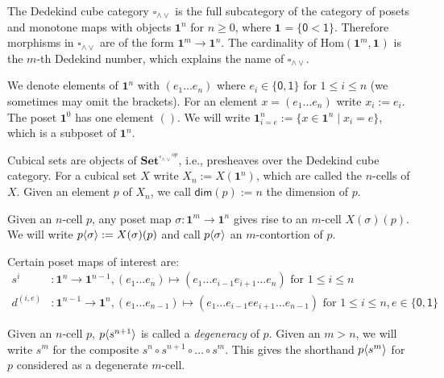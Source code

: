 \documentclass{llncs}
\newcommand{\mdef}{:=}
\newcommand{\mname}[1]{\textit{{#1}}}
\newcommand{\join}{\wedge}
\newcommand{\meet}{\vee}
\newcommand{\dedekind}{\square_{\join \meet}}
\newcommand{\pint}[1]{\mathbf{1}^{#1}}
\newcommand{\pintrestr}[3]{\mathbf{1}^{#1}_{{#2}={#3}}}
\newcommand{\izero}{\mathsf{0}}
\newcommand{\ione}{\mathsf{1}}
\newcommand{\restrict}[2]{{#1}|_{#2}}
\newcommand{\psh}[1]{\mathbf{Set}^{{#1}^{op}}}
\renewcommand{\hom}[2]{\text{Hom}({#1} , {#2})}
\renewcommand{\dim}[1]{\mathsf{dim}({#1})}
\newcommand{\smap}[1]{s^{{#1}}}
\newcommand{\dmap}[2]{d^{({#1} , {#2})}}
\newcommand{\cont}[2]{\ensuremath{ \ifthenelse{\equal{#2}{}}{#1}{{#1}\langle{#2}\rangle}} }
\begin{document}
The Dedekind cube category $\dedekind$ is the full subcategory of the category
of posets and monotone maps with objects $\pint{n}$ for $n \geq 0$, where $\pint{}
= \{ \izero < \ione \}$. Therefore morphisms in $\dedekind$ are of
the form $\pint{m} \to \pint{n}$. The cardinality of $\hom{\pint{m}}{\pint{}}$ is the
$m$-th Dedekind number, which explains the name of $\dedekind$.

We denote elements of $\pint{n}$ with $(e_1 \ldots e_n)$ where $e_i \in
\{\izero, \ione\}$ for $1 \leq i \leq n$ (we sometimes may omit the brackets).
For an element $x = (e_1 \ldots e_n)$ write $x_i \mdef e_i$. The poset
$\pint{0}$ has one element $()$. We will write $\pintrestr{n}{i}{e} \mdef
\{ x \in \pint{n} \mid x_i = e \}$, which is a subposet of $\pint{n}$.


Cubical sets are objects of $\psh{\dedekind}$, i.e., presheaves over the
Dedekind cube category. For a cubical set $X$ write $X_n \mdef X(\pint{n})$,
which are called the $n$-cells of $X$. Given an element $p$ of $X_n$, we call
$\dim{p} \mdef n$ the dimension of $p$.


Given an $n$-cell $p$, any poset map $\sigma : \pint{m} \to \pint{n}$ gives rise to an $m$-cell
$X(\sigma)(p)$. We will write $\cont{p}{\sigma} \mdef X(\sigma)(p)$ and call
$\cont{p}{\sigma}$ an $m$-contortion of $p$.

Certain poset maps of interest are:
\begin{align*}
  \smap{i} &: \pint{n} \to \pint{n-1}, (e_1 \ldots e_n) \mapsto (e_1 \ldots e_{i-1} e_{i+1} \ldots e_n) \text{ for } 1 \leq i \leq n\\
  \dmap{i}{e} &: \pint{n-1} \to \pint{n}, 
                (e_1 \ldots e_{n-1}) \mapsto (e_1 \ldots e_{i-1} e e_{i+1} \ldots e_{n-1}) \text{ for } 1 \leq i \leq n, e \in \{\izero,\ione\}
\end{align*}

Given an $n$-cell $p$, $\cont{p}{\smap{n+1}}$ is called a \mname{degeneracy} of
$p$. Given an $m > n$, we will write $\smap{m}$ for the composite
$\smap{n} \circ \smap{n+1} \circ \ldots \circ \smap{m}$. This gives the shorthand
$\cont{p}{\smap{m}}$ for $p$ considered as a degenerate $m$-cell.
\end{document}

